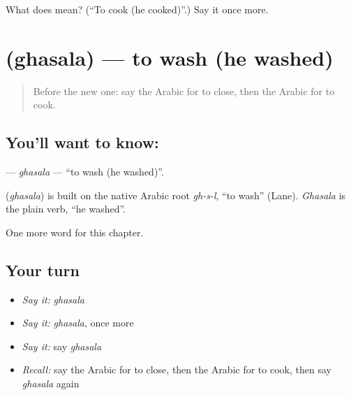 \begin{tcolorbox}[breakable,colback=teal!4,colframe=teal!35!black,title={Before you move on}]
What does  mean? (\textquotedblleft{}To cook (he cooked)\textquotedblright{}.) Say it once more.
\end{tcolorbox}
\section[\texorpdfstring{\ar{غسل} (ghasala)}{غسل (ghasala)}]{ (ghasala) — to wash (he washed)}

\label{lesson:AR-C60-ghasala}



\begin{quote}
Before the new one: say the Arabic for to close, then the Arabic for to cook.
\end{quote}

\subsection*{You'll want to know: }
\textbf{} — \emph{ghasala} — \textquotedblleft{}to wash (he washed)\textquotedblright{}.

\begin{cousinweb}
\textbf{} (\emph{ghasala}) is built on the native Arabic root \emph{gh-s-l}, \textquotedblleft{}to wash\textquotedblright{} (Lane). \emph{Ghasala} is the plain verb, \textquotedblleft{}he washed\textquotedblright{}.
\end{cousinweb}

\begin{grammarlens}[title={What you've built}]
One more word for this chapter.
\end{grammarlens}

\subsection*{Your turn}
\begin{itemize}
\raggedright
  \item \emph{Say it:} \emph{ghasala}
  \item \emph{Say it:} \emph{ghasala}, once more
  \item \emph{Say it:} say \emph{ghasala}
  \item \emph{Recall:} say the Arabic for to close, then the Arabic for to cook, then say \emph{ghasala} again
\end{itemize}

